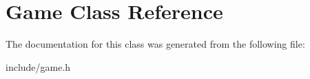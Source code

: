 \hypertarget{classGame}{}\section{Game Class Reference}
\label{classGame}


The documentation for this class was generated from the following file\+:\begin{DoxyCompactItemize}
\item 
include/game.\+h\end{DoxyCompactItemize}
